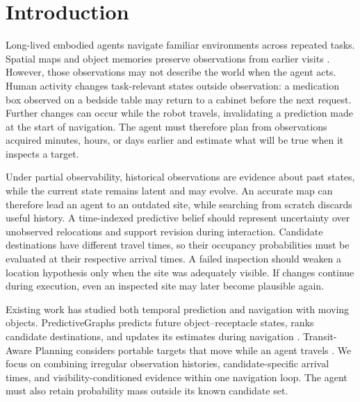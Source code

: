 \section{Introduction}
\label{sec:introduction}
Long-lived embodied agents navigate familiar environments across repeated tasks. 
Spatial maps and object memories preserve observations from earlier visits \citep{gu2024conceptgraphs,liu2024dynamem}. 
However, those observations may not describe the world when the agent acts. 
Human activity changes task-relevant states outside observation: a medication box observed on a bedside table may return to a cabinet before the next request. 
Further changes can occur while the robot travels, invalidating a prediction made at the start of navigation. 
The agent must therefore plan from observations acquired minutes, hours, or days earlier and estimate what will be true when it inspects a target.

Under partial observability, historical observations are evidence about past states, while the current state remains latent and may evolve. 
An accurate map can therefore lead an agent to an outdated site, while searching from scratch discards useful history. 
A time-indexed predictive belief should represent uncertainty over unobserved relocations and support revision during interaction. 
Candidate destinations have different travel times, so their occupancy probabilities must be evaluated at their respective arrival times. 
A failed inspection should weaken a location hypothesis only when the site was adequately visible. 
If changes continue during execution, even an inspected site may later become plausible again.

Existing work has studied both temporal prediction and navigation with moving objects. 
PredictiveGraphs predicts future object--receptacle states, ranks candidate destinations, and updates its estimates during navigation \citep{saavedraruiz2026predictivegraphs}. 
Transit-Aware Planning considers portable targets that move while an agent travels \citep{dorbala2026portable}. 
We focus on combining irregular observation histories, candidate-specific arrival times, and visibility-conditioned evidence within one navigation loop. The agent must also retain probability mass outside its known candidate set.


